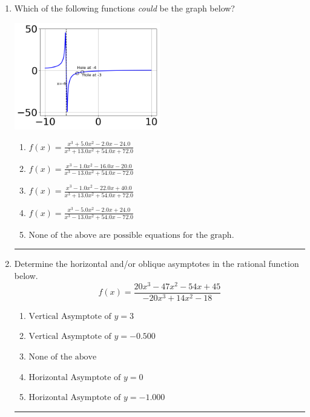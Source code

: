 \documentclass[14pt]{extbook}
\newcommand{\litem}[1]{\item#1\hspace*{-1cm}\rule{\textwidth}{0.4pt}}
\begin{document}
\begin{enumerate}
{\begin{enumerate}[label=\Alph*.]
\end{enumerate} }
\litem{
Which of the following functions \textit{could} be the graph below?
\begin{center}
    \includegraphics[width=0.5\textwidth]{../Figures/identifyGraphOfRationalFunctionCopyC.png}
\end{center}
\begin{enumerate}[label=\Alph*.]
\item \( f(x)=\frac{x^{3} +5.0 x^{2} -2.0 x -24.0}{x^{3} +13.0 x^{2} +54.0 x + 72.0} \)
\item \( f(x)=\frac{x^{3} -1.0 x^{2} -16.0 x -20.0}{x^{3} -13.0 x^{2} +54.0 x -72.0} \)
\item \( f(x)=\frac{x^{3} -1.0 x^{2} -22.0 x + 40.0}{x^{3} +13.0 x^{2} +54.0 x + 72.0} \)
\item \( f(x)=\frac{x^{3} -5.0 x^{2} -2.0 x + 24.0}{x^{3} -13.0 x^{2} +54.0 x -72.0} \)
\item \( \text{None of the above are possible equations for the graph.} \)

\end{enumerate} }
\litem{
Determine the horizontal and/or oblique asymptotes in the rational function below.\[ f(x) = \frac{20x^{3} -47 x^{2} -54 x + 45}{-20x^{3} +14 x^{2} -18} \]\begin{enumerate}[label=\Alph*.]
\item \( \text{Vertical Asymptote of } y = 3  \)
\item \( \text{Vertical Asymptote of } y = -0.500  \)
\item \( \text{None of the above} \)
\item \( \text{Horizontal Asymptote of } y = 0  \)
\item \( \text{Horizontal Asymptote of } y = -1.000  \)


\end{enumerate}}
\end{enumerate}
\end{document}
